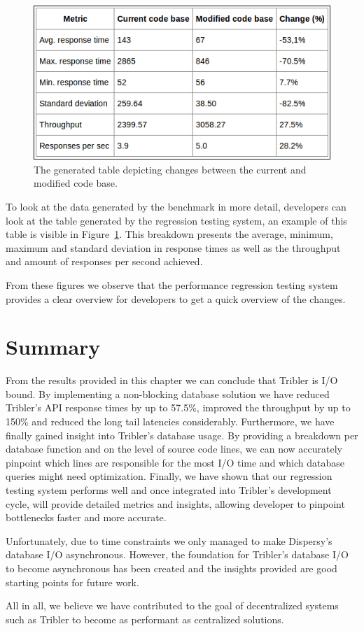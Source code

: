 \begin{figure}[!h]
	\centering
	\includegraphics[width=\linewidth]{experimentation/images/table_changes}
	\caption{The generated table depicting changes between the current and modified code base.}
	\label{fig:compare_table}
\end{figure} 

To look at the data generated by the benchmark in more detail, developers can look at the table generated by the regression testing system, an example of this table is visible in Figure~\ref{fig:compare_table}.
This breakdown presents the average, minimum, maximum and standard deviation in response times as well as the throughput and amount of responses per second achieved.

From these figures we observe that the performance regression testing system provides a clear overview for developers to get a quick overview of the changes.

\section{Summary}

From the results provided in this chapter we can conclude that Tribler is I/O bound.
By implementing a non-blocking database solution we have reduced Tribler's API response times by up to 57.5\%, improved the throughput by up to 150\% and reduced the long tail latencies considerably.
Furthermore, we have finally gained insight into Tribler's database usage.
By providing a breakdown per database function and on the level of source code lines, we can now accurately pinpoint which lines are responsible for the most I/O time and which database queries might need optimization.
Finally, we have shown that our regression testing system performs well and once integrated into Tribler's development cycle, will provide detailed metrics and insights, allowing developer to pinpoint bottlenecks faster and more accurate.

Unfortunately, due to time constraints we only managed to make Dispersy's database I/O asynchronous.
However, the foundation for Tribler's database I/O to become asynchronous has been created and the insights provided are good starting points for future work.

All in all, we believe we have contributed to the goal of decentralized systems such as Tribler to become as performant as centralized solutions. 
